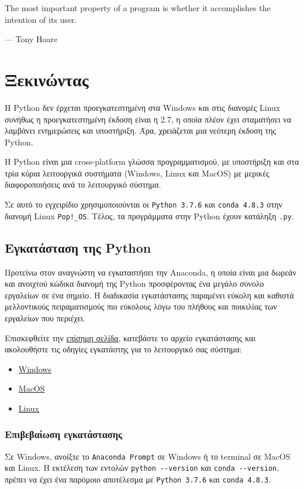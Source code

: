 \documentclass[14pt]{extreport}
\begin{document}
\epigraph{The most important property of a program is whether it accomplishes the intention of its user.}{--- Tony Hoare}

\newpage

\section{Ξεκινώντας}

Η Python δεν έρχεται προεγκατεστημένη στα Windows και στις διανομές Linux συνήθως η προεγκατεστημένη έκδοση είναι η 2.7, η οποία πλέον έχει σταματήσει να λαμβάνει ενημερώσεις και υποστήριξη. Άρα, χρειάζεται μια νεότερη έκδοση της  Python.

Η Python είναι μια cross-platform γλώσσα προγραμματισμού, με υποστήριξη και στα τρία κύρια λειτουργικά συστήματα (Windows, Linux και MacOS) με μερικές διαφοροποιήσεις ανά το λειτουργικό σύστημα.

Σε αυτό το εγχειρίδιο χρησιμοποιούνται οι \lstinline{Python 3.7.6} και \lstinline{conda 4.8.3} στην διανομή Linux \lstinline{Pop!_OS}. Τέλος, τα προγράμματα στην Python έχουν κατάληξη \lstinline{.py}.

\subsection{Εγκατάσταση της Python}
Προτείνω στον αναγνώστη να εγκαταστήσει την Anaconda, η οποία είναι μια δωρεάν και  ανοιχτού κώδικα διανομή της Python προσφέροντας ένα μεγάλο σύνολο εργαλείων σε ένα σημείο. Η διαδικασία εγκατάστασης παραμένει εύκολη και καθιστά μελλοντικούς πειραματισμούς πιο εύκολους λόγω του πλήθους και ποικιλίας των εργαλείων που περιέχει.

Επισκεφθείτε την \href{https://www.anaconda.com/products/individual#Downloads}{επίσημη σελίδα}, κατεβάστε το αρχείο εγκατάστασης και ακολουθήστε τις οδηγίες εγκατάστης για το λειτουργικό σας σύστημα:

\begin{itemize}\itemsep0cm
    \item \href{https://docs.anaconda.com/anaconda/install/windows/}{Windows}
    \item \href{https://docs.anaconda.com/anaconda/install/mac-os/}{MacOS}
    \item \href{https://docs.anaconda.com/anaconda/install/linux/}{Linux}
\end{itemize}


\subsubsection{Επιβεβαίωση εγκατάστασης}
Σε Windows, ανοίξτε το \lstinline{Anaconda Prompt} σε Windows ή το terminal σε MacOS και Linux. Η εκτέλεση των εντολών \lstinline{python --version} και \lstinline{conda --version}, πρέπει να έχει ένα παρόμοιο αποτέλεσμα με \lstinline{Python 3.7.6} και \lstinline{conda 4.8.3}.
\end{document}

